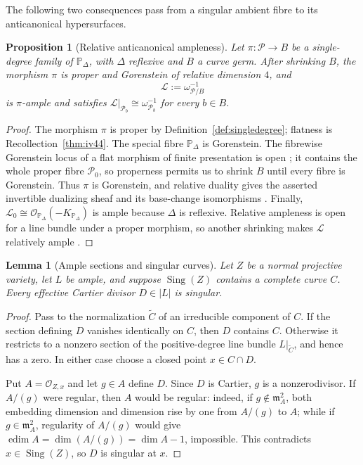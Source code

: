 \documentclass[11pt]{amsart}
\newtheorem{proposition}[theorem]{Proposition}
\newtheorem{lemma}[theorem]{Lemma}
\theoremstyle{definition}
\theoremstyle{remark}
\theoremstyle{plain}
\newcommand{\PP}{\mathbb{P}}
\newcommand{\cO}{\mathcal{O}}
\newcommand{\cP}{\mathcal{P}}
\newcommand{\cL}{\mathcal{L}}
\newcommand{\Sing}{\operatorname{Sing}}
\begin{document}
The following two consequences pass from a singular ambient fibre to
its anticanonical hypersurfaces.

\begin{proposition}[Relative anticanonical ampleness]\label{prop:relativefano}
Let $\pi\colon\cP\to B$ be a single-degree family of $\PP_\Delta$, with
$\Delta$ reflexive and $B$ a curve germ.  After shrinking $B$, the morphism
$\pi$ is proper and Gorenstein of relative dimension $4$, and
\[
  \cL:=\omega_{\cP/B}^{-1}
\]
is $\pi$-ample and satisfies
$\cL|_{\cP_b}\cong\omega_{\cP_b}^{-1}$ for every $b\in B$.
\end{proposition}

\begin{proof}
The morphism $\pi$ is proper by Definition~\ref{def:singledegree}; flatness is
Recollection~\ref{thm:iv44}.  The special fibre $\PP_\Delta$ is Gorenstein.  The
fibrewise Gorenstein locus of a flat morphism of finite presentation is open
\cite[Tag~0C09]{Stacks}; it contains the whole proper fibre $\cP_0$, so
properness permits us to shrink $B$ until every fibre is Gorenstein.  Thus
$\pi$ is Gorenstein, and relative duality gives the asserted invertible
dualizing sheaf and its base-change isomorphisms \cite{Conrad00}.  Finally,
$\cL_0\cong\cO_{\PP_\Delta}(-K_{\PP_\Delta})$ is ample because $\Delta$ is
reflexive.  Relative ampleness is open for a line bundle under a proper
morphism, so another shrinking makes $\cL$ relatively ample
\cite[Tag~0D2S]{Stacks}.
\end{proof}

\begin{lemma}[Ample sections and singular curves]
\label{lem:singcurve}
Let $Z$ be a normal projective variety, let $L$ be ample, and suppose
$\Sing(Z)$ contains a complete curve $C$.  Every effective Cartier divisor
$D\in|L|$ is singular.
\end{lemma}

\begin{proof}
Pass to the normalization $\widetilde C$ of an irreducible component of $C$.
If the section defining $D$ vanishes identically on $C$, then $D$ contains
$C$.  Otherwise it restricts to a nonzero section of the positive-degree line
bundle $L|_{\widetilde C}$, and hence has a zero.  In either case choose a
closed point $x\in C\cap D$.

Put $A=\cO_{Z,x}$ and let $g\in A$ define $D$.  Since $D$ is Cartier, $g$ is a
nonzerodivisor.  If $A/(g)$ were regular, then $A$ would be regular: indeed,
if $g\notin\mathfrak m_A^2$, both embedding dimension and dimension rise by
one from $A/(g)$ to $A$; while if $g\in\mathfrak m_A^2$, regularity of
$A/(g)$ would give
$\operatorname{edim}A=\dim(A/(g))=\dim A-1$, impossible.  This contradicts
$x\in\Sing(Z)$, so $D$ is singular at $x$.
\end{proof}
\end{document}
